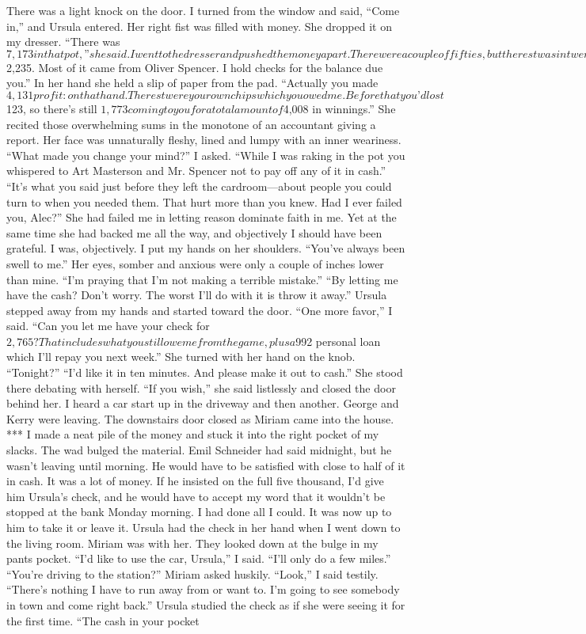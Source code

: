 \documentclass{novel}
\begin{document}
There was a light knock on the door. I turned from the window and said, “Come in,” and Ursula entered. Her right fist was filled with money. She dropped it on my dresser. “There was $7,173 in that pot,” she said. I went to the dresser and pushed the money apart. There were a couple of fifties, but the rest was in twenties and tens and smaller stuff. “How much of it is this?” “Every dollar in cash I had and could accumulate from the players—$2,235. Most of it came from Oliver Spencer. I hold checks for the balance due you.” In her hand she held a slip of paper from the pad. “Actually you made $4,131 profit: on that hand. The rest were your own chips which you owed me. Before that you’d lost $123, so there’s still $1,773 coming to you for a total amount of $4,008 in winnings.” She recited those overwhelming sums in the monotone of an accountant giving a report. Her face was unnaturally fleshy, lined and lumpy with an inner weariness. “What made you change your mind?” I asked. “While I was raking in the pot you whispered to Art Masterson and Mr. Spencer not to pay off any of it in cash.” “It’s what you said just before they left the cardroom—about people you could turn to when you needed them. That hurt more than you knew. Had I ever failed you, Alec?” She had failed me in letting reason dominate faith in me. Yet at the same time she had backed me all the way, and objectively I should have been grateful. I was, objectively. I put my hands on her shoulders. “You’ve always been swell to me.” Her eyes, somber and anxious were only a couple of inches lower than mine. “I’m praying that I’m not making a terrible mistake.” “By letting me have the cash? Don’t worry. The worst I’ll do with it is throw it away.” Ursula stepped away from my hands and started toward the door. “One more favor,” I said. “Can you let me have your check for $2,765? That includes what you still owe me from the game, plus a $992 personal loan which I’ll repay you next week.” She turned with her hand on the knob. “Tonight?” “I’d like it in ten minutes. And please make it out to cash.” She stood there debating with herself. “If you wish,” she said listlessly and closed the door behind her. I heard a car start up in the driveway and then another. George and Kerry were leaving. The downstairs door closed as Miriam came into the house. *** I made a neat pile of the money and stuck it into the right pocket of my slacks. The wad bulged the material. Emil Schneider had said midnight, but he wasn’t leaving until morning. He would have to be satisfied with close to half of it in cash. It was a lot of money. If he insisted on the full five thousand, I’d give him Ursula’s check, and he would have to accept my word that it wouldn’t be stopped at the bank Monday morning. I had done all I could. It was now up to him to take it or leave it. Ursula had the check in her hand when I went down to the living room. Miriam was with her. They looked down at the bulge in my pants pocket. “I’d like to use the car, Ursula,” I said. “I’ll only do a few miles.” “You’re driving to the station?” Miriam asked huskily. “Look,” I said testily. “There’s nothing I have to run away from or want to. I’m going to see somebody in town and come right back.” Ursula studied the check as if she were seeing it for the first time. “The cash in your pocket 
\end{document}
